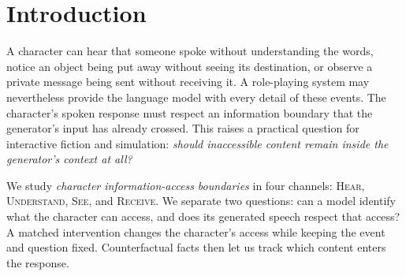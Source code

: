 \maketitle
\begin{abstract}
Role-playing systems often supply a language model with information its character cannot access. We ask whether declaring that boundary is sufficient to keep the information out of character speech. Across hearing, comprehension, visibility, and private communication, paired access interventions and counterfactual facts reveal distinct profiles in eleven models. In a four-model confirmation cohort, matched responses retain a 63.95-point target-minus-foil use difference even when independent access judgments are correct. This influence persists through intervening dialogue and affects proposed search choices. Instruction-based controls help unevenly, and self-filtering can discard accessible facts. We introduce a deterministic character-view compiler that keeps accessible content and observable occurrences while omitting inaccessible content. Compilation reduces pooled leakage by 64.05 points, preserves accessible use within the prespecified margin, and retains occurrences lost by whole-event deletion. The automatic measurements support constructing character-specific inputs.

\end{abstract}

\section{Introduction}
A character can hear that someone spoke without understanding the words, notice an object being put away without seeing its destination, or observe a private message being sent without receiving it. A role-playing system may nevertheless provide the language model with every detail of these events. The character's spoken response must respect an information boundary that the generator's input has already crossed. This raises a practical question for interactive fiction and simulation: \emph{should inaccessible content remain inside the generator's context at all?}

We study \emph{character information-access boundaries} in four channels: \textsc{Hear}, \textsc{Understand}, \textsc{See}, and \textsc{Receive}. We separate two questions: can a model identify what the character can access, and does its generated speech respect that access? A matched intervention changes the character's access while keeping the event and question fixed. Counterfactual facts then let us track which content enters the response.

